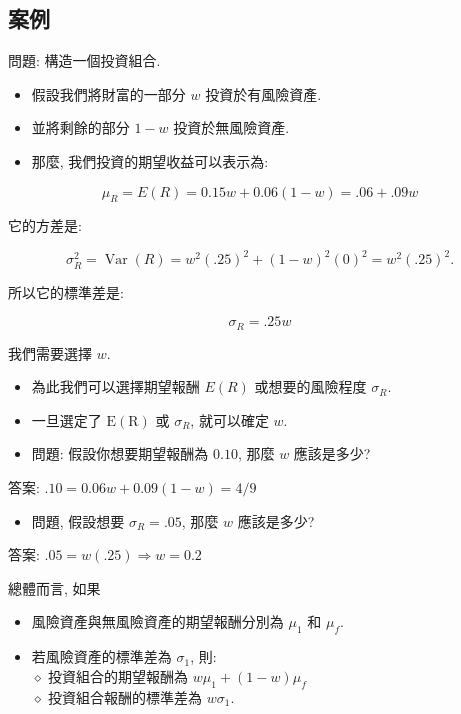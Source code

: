 \documentclass[letterpaper]{article}
\begin{document}
		\subsection{案例}
		問題: 構造一個投資組合.
		
		\begin{itemize}
			\item 假設我們將財富的一部分 $w$ 投資於有風險資產.
			\item 並將剩餘的部分 $1-w$ 投資於無風險資產.
			\item 那麼, 我們投資的期望收益可以表示為: 
		\end{itemize}
		
		
		$$
		\mu_{R}=E (R)=0.15 w+0.06 (1-w)=.06+.09 w
		$$
		
		它的方差是: 
		
		$$
		\sigma_{R}^{2}=\operatorname{Var} (R)=w^{2} (.25)^{2}+ (1-w)^{2} (0)^{2}=w^{2} (.25)^{2} .
		$$
		
		所以它的標準差是: 
		
		$$
		\sigma_{R}=.25 w
		$$
		
		我們需要選擇 $w$.
		
		\begin{itemize}
			\item 為此我們可以選擇期望報酬 $E (R)$ 或想要的風險程度 $\sigma_{R}$. 
			\item 一旦選定了 $\mathrm{E} (\mathrm{R})$ 或 $\sigma_{R}$, 就可以確定 $w$. 
			\item 問題: 假設你想要期望報酬為 $0.10$, 那麼 $w$ 應該是多少?
		\end{itemize}
		
		答案: $.10=0.06 w+0.09 (1-w)=4/9$
		
		\begin{itemize}
			\item 問題, 假設想要 $\sigma_{R}=.05$, 那麼 $w$ 應該是多少?
		\end{itemize}
		
		答案: $.05=w (.25) \Longrightarrow w=0.2$
		
		
		總體而言, 如果
		
		\begin{itemize}
			\item 風險資產與無風險資產的期望報酬分別為 $\mu_{1}$ 和 $\mu_{f}$. 
			\item 若風險資產的標準差為 $\sigma_{1}$, 則: \\
			$\diamond$ 投資組合的期望報酬為 $w \mu_{1}+ (1-w) \mu_{f}$\\
			$\diamond$ 投資組合報酬的標準差為 $w \sigma_{1}$. 
		\end{itemize}
		
\end{document}
